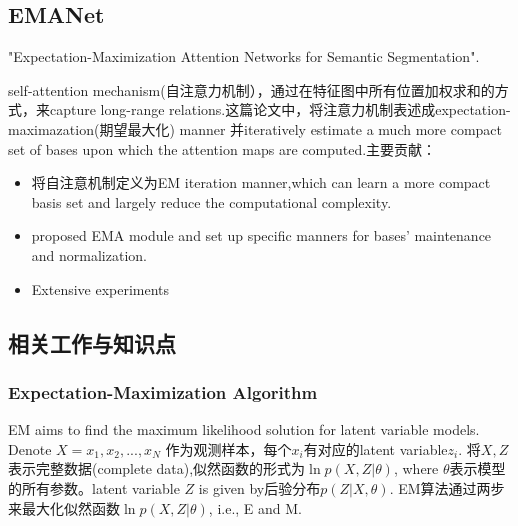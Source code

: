 \documentclass{article}
\begin{document}
\subsection{EMANet}
"Expectation-Maximization Attention Networks for Semantic Segmentation".

self-attention mechanism(自注意力机制），通过在特征图中所有位置加权求和的方式，来capture long-range relations.这篇论文中，将注意力机制表述成expectation-maximazation(期望最大化) manner 并iteratively estimate a much more compact set of bases upon which the attention maps are computed.主要贡献：
\begin{itemize}
\item 将自注意机制定义为EM iteration manner,which can learn a more compact basis set and largely reduce the computational complexity.
\item proposed EMA module and set up specific manners for bases' maintenance and normalization.
\item Extensive experiments
\end{itemize}

\subsection{相关工作与知识点}
\subsubsection{Expectation-Maximization Algorithm}
EM aims to find the maximum likelihood solution for latent variable models. Denote $X={x_1,x_2,...,x_N}	$ 作为观测样本，每个$x_i$有对应的latent variable$z_i$. 将${X,Z}$表示完整数据(complete data),似然函数的形式为$\ln p(X,Z|\theta)$, where $\theta$表示模型的所有参数。latent variable $Z$ is given by后验分布$p(Z|X,\theta)$. EM算法通过两步来最大化似然函数$\ln p(X,Z|\theta)$, i.e., E and M.
\end{document}
